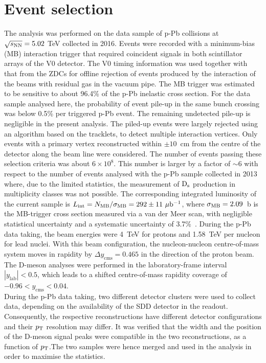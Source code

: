 \section{Event selection}
\label{sec:EvSelpPb}
The analysis was performed on the data sample of p-Pb collisions at $\sqrt{s_{\rm NN}}=5.02$ TeV
collected in 2016.
Events were recorded with a minimum-bias (MB) interaction trigger 
that required coincident signals in both scintillator arrays of the V0 detector.
The V0 timing information was used together with that from the ZDCs for offline rejection 
of events produced by the interaction of the beams with residual gas in the vacuum pipe.
The MB trigger was estimated to be sensitive to about 96.4\% of the p-Pb inelastic cross section.
For the data sample analysed here, the probability of event pile-up in the 
same bunch crossing was below 0.5\% per triggered p-Pb event.
The remaining undetected pile-up is negligible in the present analysis.
The piled-up events were largely rejected using an algorithm based on the tracklets,
to detect multiple interaction vertices.
Only events with a primary vertex reconstructed within $\pm 10$~cm from the 
centre of the detector along the beam line were considered. 
The number of events passing these selection criteria was about $6\times 10^8$.
This number is larger by a factor of $\sim$6 with respect to the number of events analysed with the p-Pb sample collected in 
2013~\cite{Abelev:2014hha,Adam:2016mkz,Adam:2016ich} where, due to the limited statistics, the measurement of ${\rm D_s}$ production
in multiplicity classes was not possible. 
The corresponding integrated luminosity of the current sample is 
$L_{\rm int} =N_{\rm MB}/\sigma_{\rm MB}=292 \pm 11~\mu{\rm b}^{-1}$,
where $\sigma_{\rm MB}=2.09$~b is the MB-trigger cross section  
measured via a van der Meer scan, with negligible statistical uncertainty 
and a systematic uncertainty of 3.7\%~\cite{Abelev:2014epa}.
During the p-Pb data taking, the beam energies were 4~TeV for 
protons and 1.58~TeV per nucleon for lead nuclei. 
With this beam configuration, the nucleon-nucleon centre-of-mass system 
moves in rapidity by $\Delta y_{\mathrm{cms}}=0.465$ in the direction 
of the proton beam. The D-meson analyses were performed in 
the laboratory-frame interval $|y_{\mathrm{lab}}|<0.5$, 
which leads to a shifted centre-of-mass rapidity coverage 
of $-0.96 < y_{\mathrm{cms}} < 0.04$.\\


During the p-Pb data taking, two different detector clusters were used to collect data, depending on the 
availability of the SDD detector in the readout. Consequently, the respective reconstructions have different
detector configurations and their $p_{\rm T}$ resolution may differ. It was verified that the 
width and the position of the D-meson signal peaks were compatible in the two
reconstructions, as a function of $p_{\rm T}$.The two samples were hence merged and 
used in the analysis in order to maximise the statistics.

